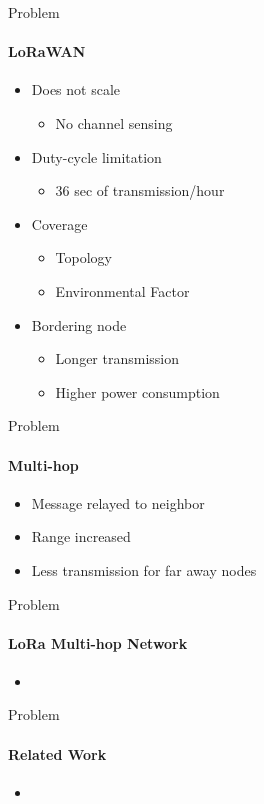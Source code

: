 \begin{frame}{Problem}
\framesubtitle{LoRaWAN}

\begin{itemize}
    \item Does not scale
    \begin{itemize}
        \item No channel sensing
    \end{itemize}
    \item Duty-cycle limitation
    \begin{itemize}
        \item 36 sec of transmission/hour
    \end{itemize}
    \item Coverage
    \begin{itemize}
        \item Topology
        \item Environmental Factor
    \end{itemize}
    \item Bordering node
    \begin{itemize}
        \item Longer transmission
        \item Higher power consumption
    \end{itemize}
\end{itemize}
\end{frame}

\begin{frame}{Problem}
\framesubtitle{Multi-hop}
\begin{itemize}
    \item Message relayed to neighbor
    \item Range increased
    \item Less transmission for far away nodes 
\end{itemize}
\end{frame}

\begin{frame}{Problem}
\framesubtitle{LoRa Multi-hop Network}
\begin{itemize}
    \item 
\end{itemize}
\end{frame}

\begin{frame}{Problem}
\framesubtitle{Related Work}
\begin{itemize}
    \item 
\end{itemize}
\end{frame}

